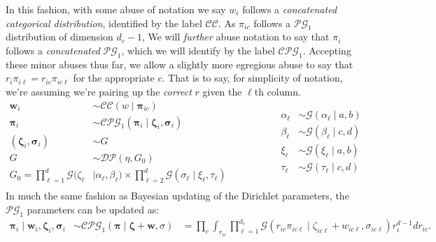 \documentclass[10pt]{article}
\begin{document}
In this fashion, with some abuse of notation we say $w_i$ follows a 
    \emph{concatenated categorical distribution}, identified by the label $\mathcal{CC}$.  As $\pi_{ic}$ 
    follows a $\mathcal{PG}_1$ distribution of dimension $d_c - 1$, We will \emph{further} abuse notation 
    to say that $\pi_i$ follows a \emph{concatenated} $\mathcal{PG}_1$, which we will identify by the
    label $\mathcal{CPG}_1$.  Accepting these minor abuses thus far, we allow a slightly more egregious abuse to say that $r_i\pi_{i\ell} = r_{ic}\pi_{ic\ell}$ for the appropriate $c$.  That is to say, for simplicity of notation, we're assuming we're pairing up the \emph{correct} $r$ given the $\ell$th column.
\begin{equation*}
  \begin{aligned}  
    \bm{w}_{i} &\sim \mathcal{CC}(w \mid \bm{\pi}_{ic})\\
    \bm{\pi}_{i} &\sim \mathcal{CPG}_1(\bm{\pi}_i \mid \bm{\zeta}_i,\bm{\sigma}_i)\\
    (\bm{\zeta}_i,\bm{\sigma}_i) &\sim G\\
    G &\sim \mathcal{DP}(\eta, G_0)\\
    G_0 = \prod_{\ell = 1}^d\mathcal{G}(\zeta_{\ell}&\mid\alpha_{\ell},\beta_{\ell})\times\prod_{\ell = 2}^d\mathcal{G}(\sigma_{\ell}\mid\xi_{\ell},\tau_{\ell})\\
    \end{aligned}
    \hspace{2cm}
    \begin{aligned}
    \alpha_{\ell} &\sim \mathcal{G}(\alpha_{\ell} \mid a, b)\\
    \beta_{\ell} &\sim \mathcal{G}(\beta_{\ell}\mid c, d)\\
    \xi_{\ell} &\sim \mathcal{G}(\xi_{\ell} \mid a, b)\\
    \tau_{\ell} &\sim \mathcal{G}(\tau_{\ell}\mid c, d)\\
  \end{aligned}
\end{equation*}
In much the same fashion as Bayesian updating of the Dirichlet parameters, the 
    $\mathcal{PG}_1$ parameters can be updated as:
\begin{equation*}
    \begin{aligned}
    \bm{\pi}_i\mid \bm{w}_i,\bm{\zeta}_i,\bm{\sigma}_i &\sim \mathcal{CPG}_1(\bm{\pi}\mid\bm{\zeta} + \bm{w}, \sigma)
    &= \prod_c\int_{r_{ic}}\prod_{\ell = 1}^{d_c}\mathcal{G}(r_{ic}\pi_{ic\ell}\mid\zeta_{ic\ell} + w_{ic\ell}, \sigma_{ic\ell})r_i^{d-1}dr_{ic}.
    \end{aligned}
\end{equation*}
\end{document}

